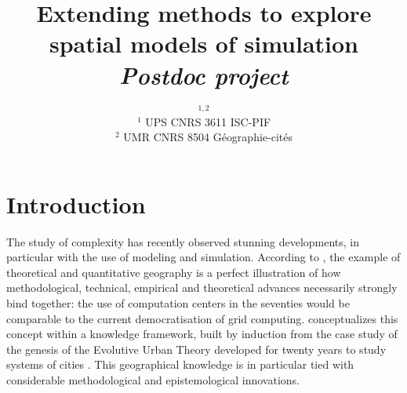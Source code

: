 


\title{Extending methods to explore spatial models of simulation\bigskip\\
\textit{Postdoc project}
}
\author{$^{1,2}$\\
$^1$ UPS CNRS 3611 ISC-PIF\\
$^2$ UMR CNRS 8504 G{\'e}ographie-cit{\'e}s
}
\date{}


\maketitle

\justify





\section{Introduction}


The study of complexity has recently observed stunning developments, in particular with the use of modeling and simulation. According to \cite{rey2015plateforme}, the example of theoretical and quantitative geography is a perfect illustration of how methodological, technical, empirical and theoretical advances necessarily strongly bind together: the use of computation centers in the seventies would be comparable to the current democratisation of grid computing. \cite{raimbault2017applied} conceptualizes this concept within a knowledge framework, built by induction from the case study of the genesis of the Evolutive Urban Theory developed for twenty years to study systems of cities \cite{pumain1997pour}. This geographical knowledge is in particular tied with considerable methodological and epistemological innovations.


